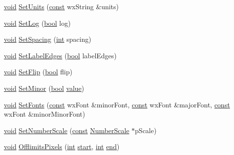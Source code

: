\begin{DoxyCompactItemize}
\hyperlink{sound_8c_ae35f5844602719cf66324f4de2a658b3}{void} \hyperlink{class_ruler_af898251ccb1b0c9c981f777c28fc9116}{Set\+Units} (\hyperlink{getopt1_8c_a2c212835823e3c54a8ab6d95c652660e}{const} wx\+String \&units)
\item 
\hyperlink{sound_8c_ae35f5844602719cf66324f4de2a658b3}{void} \hyperlink{class_ruler_aa8ce98e8d2f905e2b53196473e0b57dd}{Set\+Log} (\hyperlink{mac_2config_2i386_2lib-src_2libsoxr_2soxr-config_8h_abb452686968e48b67397da5f97445f5b}{bool} log)
\item 
\hyperlink{sound_8c_ae35f5844602719cf66324f4de2a658b3}{void} \hyperlink{class_ruler_a6a341f8d98498958621d8ba98209d865}{Set\+Spacing} (\hyperlink{xmltok_8h_a5a0d4a5641ce434f1d23533f2b2e6653}{int} spacing)
\item 
\hyperlink{sound_8c_ae35f5844602719cf66324f4de2a658b3}{void} \hyperlink{class_ruler_aa89718940d9126ca92100db6f2c8945e}{Set\+Label\+Edges} (\hyperlink{mac_2config_2i386_2lib-src_2libsoxr_2soxr-config_8h_abb452686968e48b67397da5f97445f5b}{bool} label\+Edges)
\item 
\hyperlink{sound_8c_ae35f5844602719cf66324f4de2a658b3}{void} \hyperlink{class_ruler_a36bc3f3483f08885a6e12523dfab6460}{Set\+Flip} (\hyperlink{mac_2config_2i386_2lib-src_2libsoxr_2soxr-config_8h_abb452686968e48b67397da5f97445f5b}{bool} flip)
\item 
\hyperlink{sound_8c_ae35f5844602719cf66324f4de2a658b3}{void} \hyperlink{class_ruler_afee21cb5b6440d0cb286e97176dd3bd6}{Set\+Minor} (\hyperlink{mac_2config_2i386_2lib-src_2libsoxr_2soxr-config_8h_abb452686968e48b67397da5f97445f5b}{bool} \hyperlink{lib_2expat_8h_a4a30a13b813682e68c5b689b45c65971}{value})
\item 
\hyperlink{sound_8c_ae35f5844602719cf66324f4de2a658b3}{void} \hyperlink{class_ruler_a69e844601a44fd9b839e1b5e65356579}{Set\+Fonts} (\hyperlink{getopt1_8c_a2c212835823e3c54a8ab6d95c652660e}{const} wx\+Font \&minor\+Font, \hyperlink{getopt1_8c_a2c212835823e3c54a8ab6d95c652660e}{const} wx\+Font \&major\+Font, \hyperlink{getopt1_8c_a2c212835823e3c54a8ab6d95c652660e}{const} wx\+Font \&minor\+Minor\+Font)
\item 
\hyperlink{sound_8c_ae35f5844602719cf66324f4de2a658b3}{void} \hyperlink{class_ruler_a974324aea410024d8750482c7f34a2b1}{Set\+Number\+Scale} (\hyperlink{getopt1_8c_a2c212835823e3c54a8ab6d95c652660e}{const} \hyperlink{class_number_scale}{Number\+Scale} $\ast$p\+Scale)
\item 
\hyperlink{sound_8c_ae35f5844602719cf66324f4de2a658b3}{void} \hyperlink{class_ruler_a1118ff6b8d87be5bfeda6b39bfeec3e8}{Offlimits\+Pixels} (\hyperlink{xmltok_8h_a5a0d4a5641ce434f1d23533f2b2e6653}{int} \hyperlink{seqread_8c_ac503262ae470564980711da4f78b1181}{start}, \hyperlink{xmltok_8h_a5a0d4a5641ce434f1d23533f2b2e6653}{int} \hyperlink{convtest_8m_afb358f48b1646c750fb9da6c6585be2b}{end})

\end{DoxyCompactItemize}
